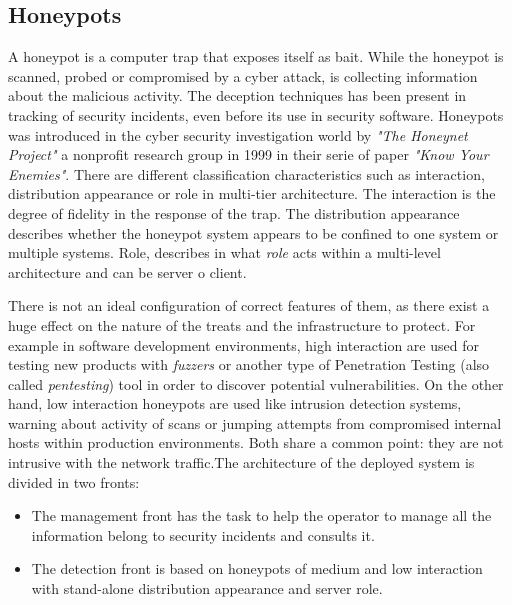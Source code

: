 \documentclass[a4paper]{llncs}
\begin{document}
\subsection{Honeypots}
A honeypot is a computer trap that exposes itself as bait. While the honeypot is scanned, probed or compromised by a cyber attack, is collecting information about the malicious activity. The deception techniques has been present in tracking of security incidents\cite{Cheswick92anevening}, even before its use in security software\cite{DTK,RoleOfDeception}. Honeypots was introduced in the cyber security investigation world by {\it"The Honeynet Project"} a nonprofit research group in 1999 in their serie of paper {\it"Know Your Enemies"}\cite{KnowYourEnemies}. There are different classification characteristics such as interaction, distribution appearance or role in multi-tier architecture\cite{Seifert06taxonomyof}. The interaction is the degree of fidelity in the response of the trap. The distribution appearance describes whether the honeypot system appears to be confined to one system or multiple systems. Role, describes in what {\it role} acts within a multi-level architecture and can be server o client.

There is not an ideal configuration of correct features of them, as there exist a huge effect on the nature of the treats and the infrastructure to protect. For example in software development environments, high interaction are used for testing new products with {\it fuzzers} or another type of Penetration Testing (also called {\it pentesting}) tool \cite{fuzzingforsec} in order to discover potential vulnerabilities. On the other hand, low interaction honeypots are used like intrusion detection systems, warning about activity of scans or jumping attempts from compromised internal hosts within production environments. Both share a common point: they are not intrusive with the network traffic.The architecture of the deployed system is divided in two fronts:
\begin{itemize}
	\item The management front has the task to help the operator to manage all the information belong to security incidents and consults it.
	\item The detection front is based on honeypots of medium and low interaction with stand-alone distribution appearance and server role.
\end{itemize}
\end{document}
